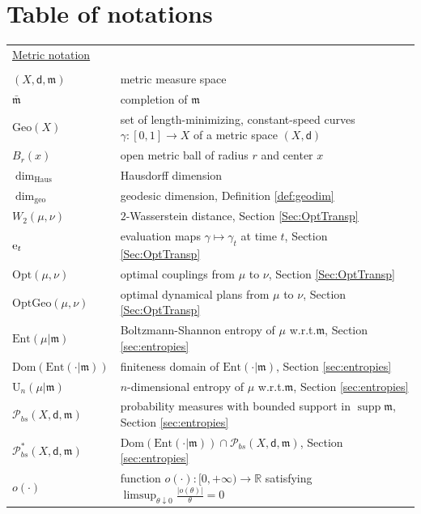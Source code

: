 \documentclass[11pt,a4paper]{article}
\theoremstyle{plain}
\theoremstyle{definition}
\theoremstyle{remark}
\numberwithin{equation}{section}
\newcommand{\R}{\mathbb{R}} %
\DeclareMathOperator{\supp}{\mathrm{supp}}
\newcommand{\Geo}{\mathrm{Geo}}
\newcommand{\Ent}{\mathrm{Ent}}
\newcommand{\U}{\mathrm{U}}
\newcommand{\Dom}{\mathrm{Dom}}
\newcommand{\Prob}{\mathcal{P}}
\newcommand{\mm}{\mathfrak m}
\newcommand{\ee}{{\rm e}}
\newcommand{\sfd}{\mathsf d}
\newcommand{\NN}{\dim_{\mathrm{geo}}}
\newcommand{\NH}{\dim_{\mathrm{Haus}}}
\begin{document}
\section{Table of notations}
\begin{xltabular}{\textwidth}{p{0.22\textwidth} X}
\underline{Metric notation} & \\
& \\
$(X,\sfd,\mm)$\dotfill &  metric measure space\\
$\bar{\mm}$ \dotfill & completion of $\mm$ \\
$\Geo(X)$ \dotfill & set of length-minimizing, constant-speed curves $\gamma:[0,1]\to X$ of a metric space $(X,\sfd)$ \\
$B_r(x)$ \dotfill & open metric ball of radius $r$ and center $x$ \\
$\NH$ \dotfill & Hausdorff dimension \\
$\NN$ \dotfill & geodesic dimension, Definition \ref{def:geodim} \\
$W_2(\mu,\nu)$\dotfill &$2$-Wasserstein distance, Section \ref{Sec:OptTransp} \\
$\ee_t$\dotfill & evaluation maps $\gamma\mapsto\gamma_t$ at time $t$, Section \ref{Sec:OptTransp}\\
$\mathrm{Opt}(\mu,\nu)$ \dotfill & optimal couplings from $\mu$ to $\nu$, Section \ref{Sec:OptTransp}  \\
$\mathrm{OptGeo}(\mu,\nu)$\dotfill & optimal dynamical plans from $\mu$ to $\nu$, Section \ref{Sec:OptTransp} \\
$\Ent(\mu|\mm)$ \dotfill & Boltzmann-Shannon entropy of $\mu$ w.r.t.\@ $\mm$, Section \ref{sec:entropies} \\
$\Dom(\Ent(\cdot|\mm))$ \dotfill & finiteness domain of $\Ent(\cdot|\mm)$, Section \ref{sec:entropies}\\
$\U_{n}(\mu|\mm)$ \dotfill & $n$-dimensional entropy of $\mu$ w.r.t.\@ $\mm$, Section \ref{sec:entropies} \\
$\Prob_{bs}(X,\sfd,\mm)$ \dotfill &  probability measures with bounded support in $\supp\mm$, Section \ref{sec:entropies}\\
$\Prob_{bs}^*(X,\sfd,\mm)$\dotfill &  $\Dom(\Ent(\cdot|\mm)) \cap \Prob_{bs}(X,\sfd,\mm)$, Section \ref{sec:entropies}\\
$o(\cdot)$ \dotfill & function $o(\cdot):[0,+\infty)\to \R$ satisfying $\displaystyle \limsup_{\theta\downarrow 0} \frac{|o(\theta)|}{\theta}=0$ \\

\end{xltabular}
\end{document}
